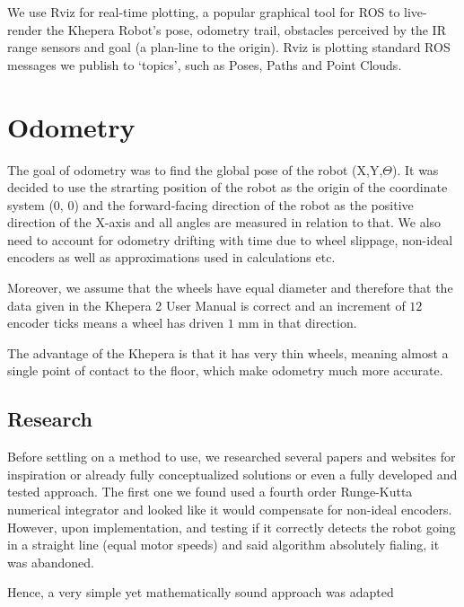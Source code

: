 \documentclass[11pt, a4paper]{article}
\begin{document}
We use Rviz for real-time plotting, a popular graphical tool for ROS to live-render the Khepera 
Robot's pose, odometry trail, obstacles perceived by the IR range sensors and goal (a plan-line 
to the origin). Rviz is plotting standard ROS messages we publish to `topics', such as Poses,
Paths and Point Clouds.




\section{Odometry}


The goal of odometry was to find the global pose of the robot (X,Y,$\Theta$). It was decided
to use the strarting position of the robot as the origin of the coordinate system ($0$, $0$) 
and the forward-facing direction of the robot as the positive direction of the X-axis and
all angles are measured in relation to that. We also need to account for odometry drifting with
time due to wheel slippage, non-ideal encoders as well as approximations used in calculations etc.

Moreover, we assume that the wheels have equal diameter and therefore that the data given in the 
Khepera 2 User Manual\cite{khepera_manual} is correct and an increment of $12$ encoder ticks 
means a wheel has driven $1$ mm in that direction. 

The advantage of the Khepera is that it has very thin wheels, meaning almost a single point of contact
to the floor, which make odometry much more accurate.

\subsection{Research}

Before settling on a method to use, we researched several papers and websites for inspiration or 
already fully conceptualized solutions or even a fully developed and tested approach. The first one
we found used a fourth order Runge-Kutta numerical integrator\cite{runge_kutta} and looked like 
it would compensate for non-ideal encoders. However, upon implementation, and  testing if it correctly 
detects the robot going in a straight line (equal motor speeds) and said algorithm absolutely fialing,
it was abandoned. 

Hence, a very simple yet mathematically sound approach\cite{odo_used} was adapted 
\end{document}

